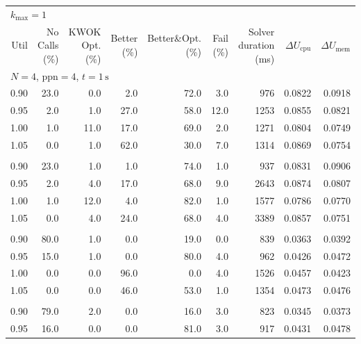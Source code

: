 \begin{table}[t]
\tiny
\setlength{\tabcolsep}{3.5pt}
\renewcommand{\arraystretch}{0.95}
\centering
\begin{tabular}{r r r r r r r r r}
\toprule
\multicolumn{9}{l}{$k_{\max}=1$} \\
\addlinespace[0.2em]
Util & No Calls (\%) & KWOK Opt. (\%) & Better (\%) & \makecell{Better\&Opt.\\(\%)} & Fail (\%) & \makecell{Solver\\duration (ms)} & $\Delta U_{\mathrm{cpu}}$ & $\Delta U_{\mathrm{mem}}$ \\
\midrule
\multicolumn{9}{l}{$N=4$, $\mathrm{ppn}=4$, $t=1\,\mathrm{s}$} \\
\midrule
0.90 & 23.0 & 0.0 & 2.0 & 72.0 & 3.0 & 976 & 0.0822 & 0.0918 \\
0.95 & 2.0 & 1.0 & 27.0 & 58.0 & 12.0 & 1253 & 0.0855 & 0.0821 \\
1.00 & 1.0 & 11.0 & 17.0 & 69.0 & 2.0 & 1271 & 0.0804 & 0.0749 \\
1.05 & 0.0 & 1.0 & 62.0 & 30.0 & 7.0 & 1314 & 0.0869 & 0.0754 \\
\addlinespace[0.35em]
\multicolumn{9}{l}{$N=4$, $\mathrm{ppn}=4$, $t=10\,\mathrm{s}$} \\
\midrule
0.90 & 23.0 & 1.0 & 1.0 & 74.0 & 1.0 & 937 & 0.0831 & 0.0906 \\
0.95 & 2.0 & 4.0 & 17.0 & 68.0 & 9.0 & 2643 & 0.0874 & 0.0807 \\
1.00 & 1.0 & 12.0 & 4.0 & 82.0 & 1.0 & 1577 & 0.0786 & 0.0770 \\
1.05 & 0.0 & 4.0 & 24.0 & 68.0 & 4.0 & 3389 & 0.0857 & 0.0751 \\
\addlinespace[0.35em]
\multicolumn{9}{l}{$N=4$, $\mathrm{ppn}=8$, $t=1\,\mathrm{s}$} \\
\midrule
0.90 & 80.0 & 1.0 & 0.0 & 19.0 & 0.0 & 839 & 0.0363 & 0.0392 \\
0.95 & 15.0 & 1.0 & 0.0 & 80.0 & 4.0 & 962 & 0.0426 & 0.0472 \\
1.00 & 0.0 & 0.0 & 96.0 & 0.0 & 4.0 & 1526 & 0.0457 & 0.0423 \\
1.05 & 0.0 & 0.0 & 46.0 & 53.0 & 1.0 & 1354 & 0.0473 & 0.0476 \\
\addlinespace[0.35em]
\multicolumn{9}{l}{$N=4$, $\mathrm{ppn}=8$, $t=10\,\mathrm{s}$} \\
\midrule
0.90 & 79.0 & 2.0 & 0.0 & 16.0 & 3.0 & 823 & 0.0345 & 0.0373 \\
0.95 & 16.0 & 0.0 & 0.0 & 81.0 & 3.0 & 917 & 0.0431 & 0.0478 \\

\end{tabular}
\end{table}
